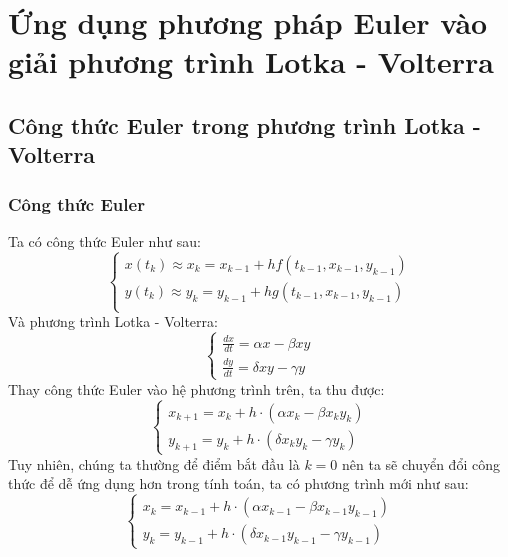 \documentclass[a4paper,15pt]{article}
\begin{document}
\section{Ứng dụng phương pháp Euler vào giải phương trình Lotka - Volterra}
\subsection{Công thức Euler trong phương trình Lotka - Volterra}
\subsubsection{Công thức Euler}
Ta có công thức Euler như sau:
\[
    \begin{cases}
    x(t_k) \approx x_k = x_{k-1} + h f(t_{k-1}, x_{k-1}, y_{k-1}) \\
    y(t_k) \approx y_k = y_{k-1} + h g(t_{k-1}, x_{k-1}, y_{k-1}) \\
    \end{cases}
\]
Và phương trình Lotka - Volterra:
\[
    \begin{cases}
    \frac{dx}{dt} = \alpha x - \beta x y \\
    \frac{dy}{dt} = \delta x y - \gamma y
    \end{cases}
\]
Thay công thức Euler vào hệ phương trình trên, ta thu được:
\[
\begin{cases}
x_{k+1} = x_k + h \cdot \left( \alpha x_k - \beta x_k y_k \right) \\
y_{k+1} = y_k + h \cdot \left( \delta x_k y_k - \gamma y_k \right)
\end{cases}
\]
Tuy nhiên, chúng ta thường để điểm bắt đầu là $k=0$ nên ta sẽ chuyển đổi công thức để dễ ứng dụng hơn trong tính toán, ta có phương trình mới như sau:
\[
    \begin{cases}
        x_{k} = x_{k-1} + h \cdot \left( \alpha x_{k-1} - \beta x_{k-1} y_{k-1} \right) \\
y_{k} = y_{k-1} + h \cdot \left( \delta x_{k-1} y_{k-1} - \gamma y_{k-1} \right)
    \end{cases}
\]
\end{document}
